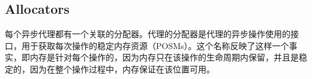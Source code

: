 \subsection{Allocators}
每个异步代理都有一个关联的分配器。代理的分配器是代理的异步操作使用的接口，用于获取每次操作的稳定内存资源（POSMs）。这个名称反映了这样一个事实，即内存是针对每个操作的，因为内存只在该操作的生命周期内保留，并且是稳定的，因为在整个操作过程中，内存保证在该位置可用。
